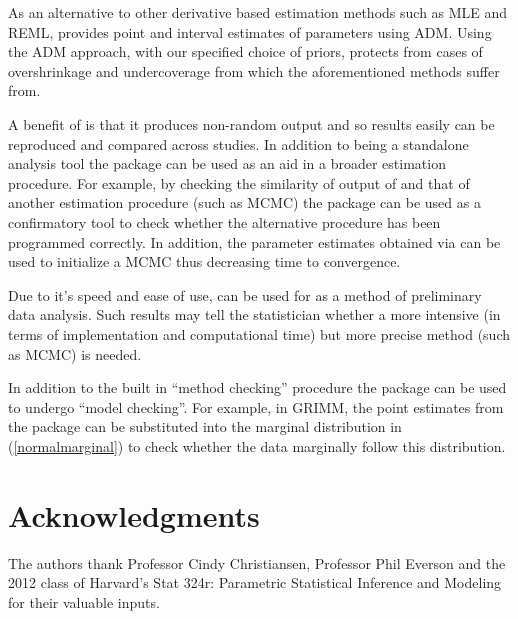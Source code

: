 \documentclass[article]{jss}
\begin{document}
As an alternative to other derivative based estimation methods such as MLE and REML,  provides point and interval estimates of parameters using ADM. Using the ADM approach, with our specified choice of priors, protects from cases of overshrinkage and undercoverage from which the aforementioned methods suffer from. %


A benefit of  is that it produces non-random output and so results easily can be reproduced and compared across studies. In addition to being a standalone analysis tool the package can be used as an aid in a broader estimation procedure. For example, by checking the similarity of output of  and that of another estimation procedure (such as MCMC) the package can be used as a confirmatory tool to check whether the alternative procedure has been programmed correctly. In addition, the parameter estimates obtained via  can be used to initialize a MCMC thus decreasing time to convergence. %

Due to it's speed and ease of use,  can be used for as a method of preliminary data analysis. Such results may tell the statistician whether a more intensive (in terms of implementation and computational time) but more precise method (such as MCMC) is needed. 


In addition to the built in ``method checking'' procedure the package can be used to undergo ``model checking''. For example, in GRIMM, the point estimates from the package can be substituted into the marginal distribution in (\ref{normalmarginal}) to check whether the data marginally follow this distribution.


\section[acknowledgments]{Acknowledgments}
The authors thank Professor Cindy Christiansen, Professor Phil Everson and the 2012 class of Harvard's Stat 324r: Parametric Statistical Inference and Modeling for their valuable inputs.


\end{document}
